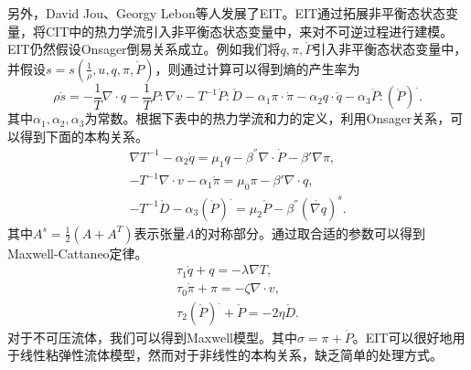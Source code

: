 \documentclass{article}
\begin{document}
另外，David Jou、Georgy Lebon等人发展了EIT。EIT通过拓展非平衡态状态变量，将CIT中的热力学流引入非平衡态状态变量中，来对不可逆过程进行建模。EIT仍然假设Onsager倒易关系成立。例如我们将$q,\pi,\mathring{P}$引入非平衡态状态变量中，并假设$s = s(\frac{1}{\rho}, u,q,\pi,\mathring{P} )$，则通过计算可以得到熵的产生率为
\begin{equation*}
		\rho \dot{s} = - \frac{1}{T} \nabla \cdot q - \frac{1}{T} P: \nabla v - T^{-1} \mathring{P} : \mathring{D} - \alpha_1 \pi \cdot \dot{\pi} - \alpha_2 q \cdot \dot{q} - \alpha_3 \mathring{P} : ({\mathring{P} })^. .
\end{equation*}
其中$\alpha_1,\alpha_2,\alpha_3$为常数。根据下表中的热力学流和力的定义，利用Onsager关系，可以得到下面的本构关系。
\begin{subequations} \label{eq:EITconstitutive}
		\begin{align}
	\nabla T^{-1} - \alpha_2 \dot{q} = \mu_1 q - \beta^{''}\nabla \cdot \dot{P} - \beta' \nabla \pi, \\
	-T^{-1} \nabla \cdot v - \alpha_1 \dot{\pi} = \mu_0 \pi - \beta' \nabla \cdot q , \\
	-T^{-1} \mathring{D} - \alpha_3 (\mathring{P})^. = \mu_2 \mathring{P} - \beta^{''} (\mathring{\nabla q})^s. 
		\end{align}
\end{subequations}
其中$A^s = \frac{1}{2} (A+A^T)$表示张量$A$的对称部分。通过取合适的参数可以得到Maxwell-Cattaneo定律。
\begin{eqnarray*}
	\tau_1 \dot{q} + q = - \lambda \nabla T, \\
 	\tau_0 \dot{\pi } + \pi = -\zeta \nabla \cdot v, \\
 	\tau_2 (\mathring{P})^. + \mathring{P} = -2 \eta \mathring{D}.
\end{eqnarray*}
对于不可压流体，我们可以得到Maxwell模型。其中$\sigma = \pi + \mathring{P} $。EIT可以很好地用于线性粘弹性流体模型，然而对于非线性的本构关系，缺乏简单的处理方式\cite{}。
\end{document}
